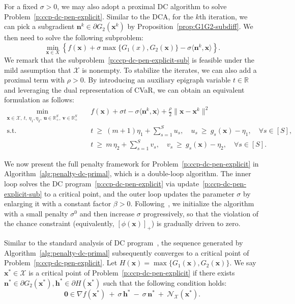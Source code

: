 \documentclass[11pt]{article}
\def\bs{\boldsymbol}
\def\Re{\mathbb{R}}
\def\N{\mathcal{N}}
\def\X{\mathcal{X}}
\begin{document}
For a fixed $\sigma > 0$, we may also adopt a proximal DC algorithm to solve Problem~\eqref{p:ccp-dc-pen-explicit}. Similar to the DCA, for the $k$th iteration, we can pick a subgradient $\bs{n}^k \in \partial G_2(\bs{x}^k)$ by Proposition~\ref{prop:G1G2-subdiff}. We then need to solve the following subproblem:
\begin{equation} \label{p:ccp-dc-pen-explicit-sub}
\min_{\bs{x} \in X} \left\{ f(\bs{x}) + \sigma \max\{G_1(x), G_2(\bs{x})\} - \sigma \langle \bs{n}^k, \bs{x}\rangle \right\}.
\end{equation}
We remark that the subproblem~\eqref{p:ccp-dc-pen-explicit-sub} is feasible under the mild assumption that $\X$ is nonempty. To stabilize the iterates, we can also add a proximal term with $\rho>0$. By introducing an auxiliary epigraph variable $t \in \Re$ and leveraging the dual representation of CVaR, we can obtain an equivalent formulation as follows:
\begin{equation} \label{p:ccp-dc-pen-explicit-sub-equiv}
\begin{aligned}
\min_{\bs{x}\in \X,\ t,\ \eta_1,\eta_2,\ \bs{u}\in\Re_+^S,\ \bs{v}\in\Re_+^S}\quad
& f(\bs{x}) + \sigma t - \sigma \langle \bs{n }^k,\bs{x}\rangle + \frac{\rho}{2}\|\bs{x} - \bs{x}^k\|^2\\
\text{s.t.}\quad
& t \ \ge\ (m+1)\eta_1 + \sum_{s=1}^S u_s, \quad u_s \ \ge\ g_s(\bs{x}) - \eta_1,\quad \forall s\in[S], \\
& t \ \ge\ m\,\eta_2 + \sum_{s=1}^S v_s, \quad v_s \ \ge\ g_s(\bs{x}) - \eta_2,\quad  \forall s\in[S].
\end{aligned}
\end{equation}

We now present the full penalty framework for Problem~\eqref{p:ccp-dc-pen-explicit} in Algorithm~\ref{alg:penalty-dc-primal}, which is a double-loop algorithm. The inner loop solves the DC program~\eqref{p:ccp-dc-pen-explicit} via update~\eqref{p:ccp-dc-pen-explicit-sub} to a critical point, and the outer loop updates the parameter $\sigma$ by enlarging it with a constant factor $\beta >0$. Following~\cite[Chapter 17]{nocedal2006numerical}, we initialize the algorithm with a small penalty $\sigma^0$ and then increase $\sigma$ progressively, so that the violation of the chance constraint (equivalently, $[\phi(\bs{x})]_+$) is gradually driven to zero. 

Similar to the standard analysis of DC program~\cite{horst1999dc}, the sequence generated by Algorithm~\ref{alg:penalty-dc-primal} subsequently converges to a critical point of Problem~\eqref{p:ccp-dc-pen-explicit}. Let $H(\bs{x}) = \max\{G_1(\bs{x}), G_2(\bs{x})\}$. We say $\bs{x}^* \in \X$ is a critical point of Problem~\eqref{p:ccp-dc-pen-explicit} if there exists $\bs{n}^* \in \partial G_2(\bs{x}^*),\bs{h}^* \in \partial H(\bs{x}^*)$ such that the following condition holds:
\begin{equation*}
\bs{0} \in 
\nabla f(\bs{x}^*)
\ +\ \sigma\,\bs{h}^*
\ -\ \sigma\,\bs{n}^*
\ +\ \N_{\X}(\bs{x}^*).
\end{equation*}
\end{document}
